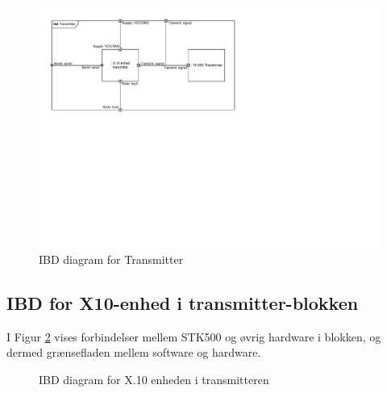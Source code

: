 \begin{figure}[h]
	\centering
	\includegraphics[scale=0.8,trim=30 335 350 30, clip=true]{Systemarkitektur/Diagrammer/IBD_Transmitter.pdf}
	\caption{IBD diagram for Transmitter}
	\label{fig:IBDtransmitter}
\end{figure}

\subsection{IBD for X10-enhed i transmitter-blokken}

I Figur \ref{fig:IBDx.10transmit} vises forbindelser mellem STK500 og øvrig hardware i blokken, og dermed grænsefladen mellem software og hardware.

\begin{figure}[h]
	\centering {}
	\caption{IBD diagram for X.10 enheden i transmitteren}
	\label{fig:IBDx.10transmit}
\end{figure}

